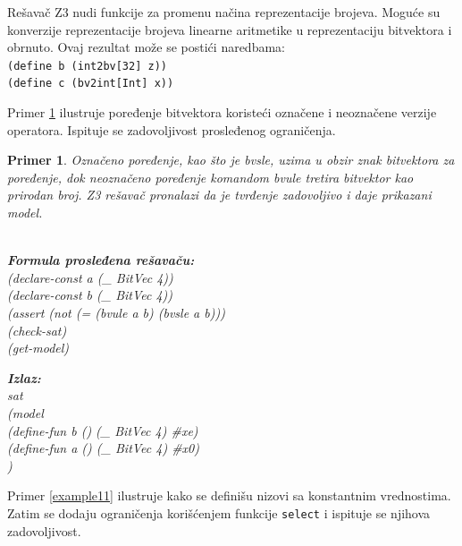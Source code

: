 \documentclass[12pt,oneside]{memoir}
\newcommand\tab[1][0.5cm]{\hspace*{#1}}
\newtheorem{primer}{Primer}
\begin{document}
Rešavač Z3 nudi funkcije za promenu načina reprezentacije brojeva. Moguće su konverzije reprezentacije brojeva linearne aritmetike u reprezentaciju bitvektora i obrnuto. Ovaj rezultat može se postići naredbama: \\
\texttt{(define b (int2bv[32] z))} \\  
\texttt{(define c (bv2int[Int] x))}
\par
Primer \ref{example10} ilustruje poređenje bitvektora koristeći označene i neoznačene verzije operatora. Ispituje se zadovoljivost prosleđenog ograničenja.
\begin{primer} \label{example10} Označeno poređenje, kao što je bvsle, uzima u obzir znak bitvektora za poređenje, dok neoznačeno poređenje komandom bvule tretira bitvektor kao prirodan broj. Z3 rešavač pronalazi da je tvrđenje zadovoljivo i daje prikazani model.
\\ \\
\begin{minipage}[b]{0.5\textwidth}
\textbf{Formula prosleđena rešavaču:}
\\(declare-const a (\_ BitVec 4))
\\(declare-const b (\_ BitVec 4))
\\(assert (not (= (bvule a b) (bvsle a b)))
\\(check-sat)
\\(get-model)
\end{minipage}
\hspace{1.15cm} 
\begin{minipage}[t]{0.5\textwidth}
\vspace{-3.45cm}
\textbf{Izlaz:}
\\sat 
\\(model 
\\\tab(define-fun b () (\_ BitVec 4) \#xe) 
\\\tab(define-fun a () (\_ BitVec 4) \#x0)
\\)
\end{minipage}
\end{primer}
\par
Primer \ref{example11} ilustruje kako se definišu nizovi sa konstantnim vrednostima. Zatim se dodaju ograničenja korišćenjem funkcije \texttt{select} i ispituje se njihova zadovoljivost.
\end{document}
